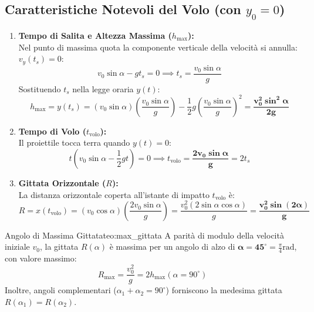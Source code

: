 \subsection{Caratteristiche Notevoli del Volo (con $y_0 = 0$)}

\begin{enumerate}
    \item \textbf{Tempo di Salita e Altezza Massima ($h_{\max}$):}\\
    Nel punto di massima quota la componente verticale della velocità si annulla: $v_y(t_s) = 0$:
    \begin{equation}
        v_0\sin\alpha - g t_s = 0 \implies t_s = \frac{v_0\sin\alpha}{g}
    \end{equation}
    Sostituendo $t_s$ nella legge oraria $y(t)$:
    \begin{equation}
        h_{\max} = y(t_s) = (v_0\sin\alpha)\left(\frac{v_0\sin\alpha}{g}\right) - \frac{1}{2}g\left(\frac{v_0\sin\alpha}{g}\right)^2 = \mathbf{\frac{v_0^2 \sin^2\alpha}{2g}}
        \label{eq:altezza_max}
    \end{equation}

    \item \textbf{Tempo di Volo ($t_{\text{volo}}$):}\\
    Il proiettile tocca terra quando $y(t) = 0$:
    \begin{equation}
        t\left(v_0\sin\alpha - \frac{1}{2}g t\right) = 0 \implies t_{\text{volo}} = \mathbf{\frac{2 v_0 \sin\alpha}{g}} = 2 t_s
    \end{equation}

    \item \textbf{Gittata Orizzontale ($R$):}\\
    La distanza orizzontale coperta all'istante di impatto $t_{\text{volo}}$ è:
    \begin{equation}
        R = x(t_{\text{volo}}) = (v_0\cos\alpha)\left(\frac{2 v_0 \sin\alpha}{g}\right) = \frac{v_0^2 (2\sin\alpha\cos\alpha)}{g} = \mathbf{\frac{v_0^2 \sin(2\alpha)}{g}}
        \label{eq:gittata}
    \end{equation}
\end{enumerate}

\begin{teorema}{Angolo di Massima Gittata}{teo:max_gittata}
A parità di modulo della velocità iniziale $v_0$, la gittata $R(\alpha)$ è massima per un angolo di alzo di $\mathbf{\alpha = 45^\circ} = \frac{\pi}{4}\si{\radian}$, con valore massimo:
\begin{equation}
    R_{\max} = \frac{v_0^2}{g} = 2 h_{\max}(\alpha=90^\circ)
\end{equation}
Inoltre, angoli complementari ($\alpha_1 + \alpha_2 = 90^\circ$) forniscono la medesima gittata $R(\alpha_1) = R(\alpha_2)$.
\end{teorema}


